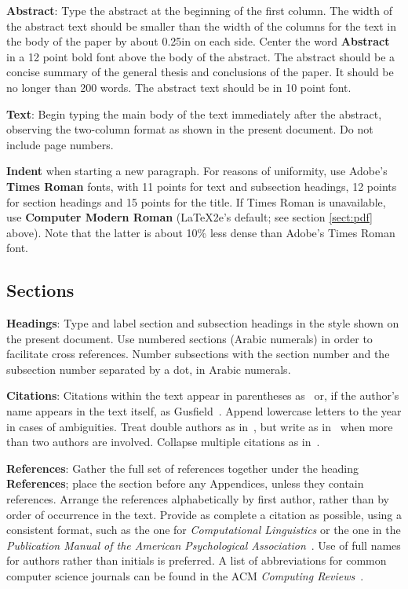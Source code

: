 \documentclass[11pt,letterpaper]{article}
\begin{document}
{\bf Abstract}: Type the abstract at the beginning of the first
column.  The width of the abstract text should be smaller than the
width of the columns for the text in the body of the paper by about
0.25in on each side.  Center the word {\bf Abstract} in a 12 point
bold font above the body of the abstract. The abstract should be a
concise summary of the general thesis and conclusions of the paper.
It should be no longer than 200 words.  The abstract text should be in 10 point font.

{\bf Text}: Begin typing the main body of the text immediately after
the abstract, observing the two-column format as shown in
the present document.  Do not include page numbers.

{\bf Indent} when starting a new paragraph. For reasons of uniformity,
use Adobe's {\bf Times Roman} fonts, with 11 points for text and
subsection headings, 12 points for section headings and 15 points for
the title.  If Times Roman is unavailable, use {\bf Computer Modern
  Roman} (\LaTeX2e{}'s default; see section \ref{sect:pdf} above).
Note that the latter is about 10\% less dense than Adobe's Times Roman
font.

\subsection{Sections}

{\bf Headings}: Type and label section and subsection headings in the
style shown on the present document.  Use numbered sections (Arabic
numerals) in order to facilitate cross references. Number subsections
with the section number and the subsection number separated by a dot,
in Arabic numerals.

{\bf Citations}: Citations within the text appear
in parentheses as~\cite{Gusfield:97} or, if the author's name appears in
the text itself, as Gusfield~.
Append lowercase letters to the year in cases of ambiguities.
Treat double authors as in~\cite{Aho:72}, but write as
in~\cite{Chandra:81} when more than two authors are involved.
Collapse multiple citations as in~\cite{Gusfield:97,Aho:72}.

\textbf{References}: Gather the full set of references together under
the heading {\bf References}; place the section before any Appendices,
unless they contain references. Arrange the references alphabetically
by first author, rather than by order of occurrence in the text.
Provide as complete a citation as possible, using a consistent format,
such as the one for {\em Computational Linguistics\/} or the one in the
{\em Publication Manual of the American
Psychological Association\/}~\cite{APA:83}.  Use of full names for
authors rather than initials is preferred.  A list of abbreviations
for common computer science journals can be found in the ACM
{\em Computing Reviews\/}~\cite{ACM:83}.
\end{document}
